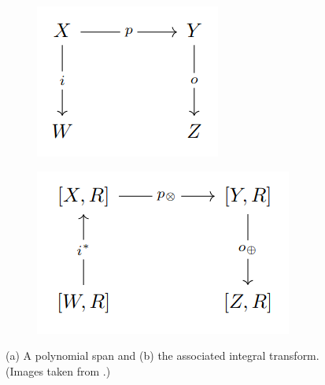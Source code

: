 \documentclass[11pt,a4paper,openright,twoside]{report}
\theoremstyle{plain}
\theoremstyle{definition}
\begin{document}
\begin{figure}[h]
  \begin{center}
    \begin{subfigure}{0.21\textwidth}
      \includegraphics[width=\textwidth]{figures/polynomial_span.png}
      \caption{}
    \end{subfigure}
    \begin{subfigure}{0.28\textwidth}
      \includegraphics[width=\textwidth]{figures/integral_transform.png}
      \caption{}
    \end{subfigure}            
    \caption[Integral transform]{(a) A polynomial span and (b) the associated integral transform. (Images taken from \cite{dudzik2022graph}.)}
    \label{fig: inttransform}
  \end{center}
\end{figure}
\end{document}
